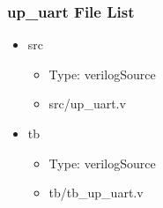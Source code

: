 \subsubsection{up\_uart File List}
\begin{itemize}
\item src
	\begin{itemize}
	\item[$\space$] Type: verilogSource
	\item src/up\_uart.v
	\end{itemize}
\item tb
	\begin{itemize}
	\item[$\space$] Type: verilogSource
	\item tb/tb\_up\_uart.v
	\end{itemize}
\end{itemize}
